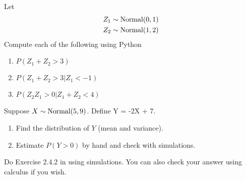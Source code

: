 




\begin{exercise} Let
\begin{align*}
Z_1 &\sim {\rm Normal}(0,1)\\
Z_2 &\sim {\rm Normal}(1,2)
\end{align*} 
Compute each of the following using Python
\begin{enumerate}[label=(\alph*)]
\item $P(Z_1 + Z_2>3)$
\item $P(Z_1 + Z_2>3|Z_1<-1)$
\item $P(Z_2Z_1>0|Z_1+Z_2<4)$
\end{enumerate}
\end{exercise}

\begin{exercise}
Suppose $X \sim {\rm Normal}(5,9)$. Define
Y = -2X + 7.
\begin{enumerate}[label=(\alph*)]
\item Find the distribution of $Y$ (mean and variance).
\item Estimate $P(Y > 0)$ by hand and check with simulations. 
\end{enumerate}
\end{exercise}




\begin{exercise}
Do Exercise  2.4.2 in  \cite{evans} using simulations. You can also check your answer using calculus if you wish. 
\end{exercise}


